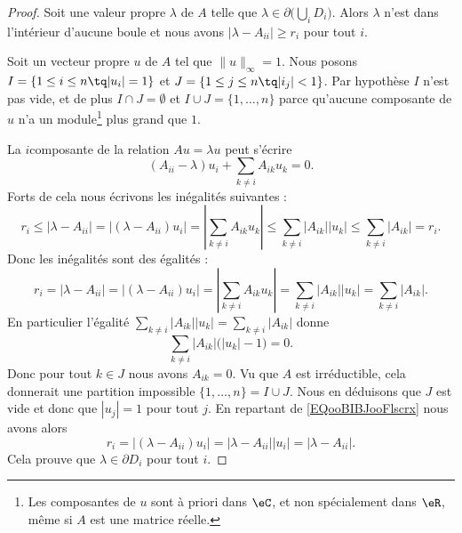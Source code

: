 \begin{proof}
	Soit une valeur propre \( \lambda\) de \( A\) telle que \( \lambda\in \partial\big( \bigcup_iD_i \big)\). Alors \( \lambda\) n'est dans l'intérieur d'aucune boule et nous avons \( | \lambda-A_{ii} |\geq r_i\) pour tout \( i\).

	Soit un vecteur propre \( u\) de \( A\) tel que \( \| u \|_{\infty}=1\). Nous posons \( I= \{ 1\leq i\leq n \tq | u_i |=1 \}  \) et \( J=\{ 1\leq j\leq n\tq | i_j |<1 \}\). Par hypothèse \( I\) n'est pas vide, et de plus \( I\cap J=\emptyset\) et \( I\cup J=\{ 1,\ldots, n \}\) parce qu'aucune composante de \( u\) n'a un module\footnote{Les composantes de \( u\) sont à priori dans \( \eC\), et non spécialement dans \( \eR\), même si \( A\) est une matrice réelle.} plus grand que \( 1\).

	La \( i\)\ieme composante de la relation \( Au=\lambda u\) peut s'écrire
	\begin{equation}
		(A_{ii}-\lambda)u_i+\sum_{k\neq i}A_{ik}u_k=0.
	\end{equation}
	Forts de cela nous écrivons les inégalités suivantes :
	\begin{equation}
		r_i\leq | \lambda-A_{ii} |=\big| (\lambda-A_{ii})u_i \big|=| \sum_{k\neq i}A_{ik}u_k |\leq \sum_{k\neq i}| A_{ik} | |u_k |\leq \sum_{k\neq i}| A_{ik} |=r_i.
	\end{equation}
	Donc les inégalités sont des égalités :
	\begin{equation}        \label{EQooBIBJooFlscrx}
		r_i= | \lambda-A_{ii} |=\big| (\lambda-A_{ii})u_i \big|=| \sum_{k\neq i}A_{ik}u_k |=\sum_{k\neq i}| A_{ik} | |u_k |=\sum_{k\neq i}| A_{ik} |.
	\end{equation}
	En particulier l'égalité \( \sum_{k\neq i}| A_{ik} | |u_k |=\sum_{k\neq i}| A_{ik} |\) donne
	\begin{equation}
		\sum_{k\neq i}| A_{ik} |\big( | u_k |-1 \big)=0.
	\end{equation}
	Donc pour tout \( k\in J\) nous avons \( A_{ik}=0\). Vu que \( A\) est irréductible, cela donnerait une partition impossible \( \{ 1,\ldots, n \}=I\cup J\). Nous en déduisons que \( J\) est vide et donc que \( | u_j |=1\) pour tout \( j\). En repartant de \eqref{EQooBIBJooFlscrx} nous avons alors
	\begin{equation}
		r_i=\big| (\lambda-A_{ii})u_i \big|=| \lambda-A_{ii} | |u_i |=| \lambda-A_{ii} |.
	\end{equation}
	Cela prouve que \( \lambda\in\partial D_i\) pour tout \( i\).
\end{proof}

